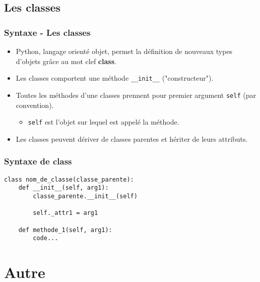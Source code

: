 \subsection{Les classes}
\begin{frame}[fragile]
  \frametitle{Syntaxe - Les classes}
  \begin{itemize}
    \item<1-> Python, langage orienté objet, permet la définition de nouveaux types d'objets grâce au mot clef {\bf class}.
    \item<2-> Les classes comportent une méthode \verb=__init__= ("constructeur").
    \item<3-> Toutes les méthodes d'une classes prennent pour premier argument \verb=self= (par convention).
    \begin{itemize}
      \item<3-> \verb=self= est l'objet sur lequel est appelé la méthode.
    \end{itemize}
    \item<4-> Les classes peuvent dériver de classes parentes et hériter de leurs attributs.
  \end{itemize}
\end{frame}

\begin{frame}[fragile]
  \frametitle{Syntaxe de class}
  \begin{lstlisting}
class nom_de_classe(classe_parente):
    def __init__(self, arg1):
        classe_parente.__init__(self)

        self._attr1 = arg1

    def methode_1(self, arg1):
        code...
  \end{lstlisting}
\end{frame}

\section{Autre}
